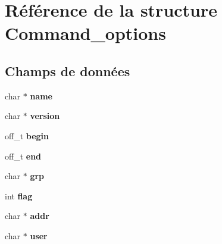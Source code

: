 \hypertarget{struct_command__options}{\section{Référence de la structure Command\-\_\-options}
\label{struct_command__options}
}
\subsection*{Champs de données}
\begin{DoxyCompactItemize}
\item 
\hypertarget{struct_command__options_a5ac083a645d964373f022d03df4849c8}{char $\ast$ {\bfseries name}}\label{struct_command__options_a5ac083a645d964373f022d03df4849c8}

\item 
\hypertarget{struct_command__options_a56abfaab87c46691c1ef3ad0df23e864}{char $\ast$ {\bfseries version}}\label{struct_command__options_a56abfaab87c46691c1ef3ad0df23e864}

\item 
\hypertarget{struct_command__options_a6890c4a9b97760f22db3acd8c7c6c81e}{off\-\_\-t {\bfseries begin}}\label{struct_command__options_a6890c4a9b97760f22db3acd8c7c6c81e}

\item 
\hypertarget{struct_command__options_a6b744082ecd6f39e8b56e8d7d6413499}{off\-\_\-t {\bfseries end}}\label{struct_command__options_a6b744082ecd6f39e8b56e8d7d6413499}

\item 
\hypertarget{struct_command__options_a469f221a5d0a0abb4ce4526d185b9740}{char $\ast$ {\bfseries grp}}\label{struct_command__options_a469f221a5d0a0abb4ce4526d185b9740}

\item 
\hypertarget{struct_command__options_adf916204820072417ed73a32de1cefcf}{int {\bfseries flag}}\label{struct_command__options_adf916204820072417ed73a32de1cefcf}

\item 
\hypertarget{struct_command__options_aa0e04e47800a4ae6a856f0fdb5426215}{char $\ast$ {\bfseries addr}}\label{struct_command__options_aa0e04e47800a4ae6a856f0fdb5426215}

\item 
\hypertarget{struct_command__options_a14871705f45ccdc5bb9f4549efd8e119}{char $\ast$ {\bfseries user}}\label{struct_command__options_a14871705f45ccdc5bb9f4549efd8e119}


\end{DoxyCompactItemize}
